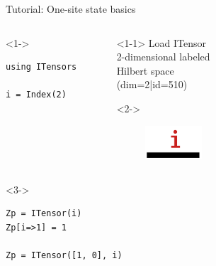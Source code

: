 \begin{frame}[fragile]{Tutorial: One-site state basics}

\begin{columns}

\begin{column}[T]{0.48\textwidth}
\begin{onlyenv}<1->
\begin{lstlisting}[language=JuliaLocal, style=julia, basicstyle=\scriptsize\ttfamily]
using ITensors

i = Index(2)

 \end{lstlisting}
\end{onlyenv}
\end{column}

\begin{column}[T]{0.48\textwidth}

\begin{onlyenv}<1-1>
Load ITensor \\[\baselineskip]
2-dimensional labeled \\
Hilbert space \\
(dim=2|id=510)
\end{onlyenv}

\begin{onlyenv}<2->
\begin{figure}[T]
  \includegraphics[width=0.3\textwidth]{
    slides/assets/i.png
  }
\end{figure}
\end{onlyenv}

\end{column}


\end{columns}

\begin{columns}

\begin{column}[T]{0.48\textwidth}
\begin{onlyenv}<3->
\begin{lstlisting}[language=JuliaLocal, style=julia, basicstyle=\scriptsize\ttfamily]
Zp = ITensor(i)
Zp[i=>1] = 1

Zp = ITensor([1, 0], i)
\end{lstlisting}
\end{onlyenv}
\end{column}


\end{columns}
\end{frame}
